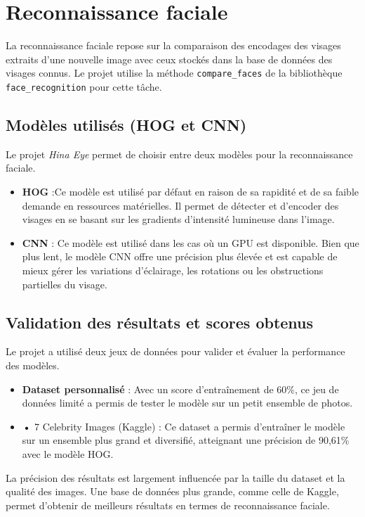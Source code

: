 \documentclass[a4paper,12pt]{report}
\begin{document}
\section{Reconnaissance faciale}
La reconnaissance faciale repose sur la comparaison des encodages des visages extraits d'une nouvelle image avec ceux stockés dans la base de données des visages connus. Le projet utilise la méthode \texttt{compare\_faces} de la bibliothèque \texttt{face\_recognition} pour cette tâche.

\subsection{Modèles utilisés (HOG et CNN)}
Le projet \textit{Hina Eye} permet de choisir entre deux modèles pour la reconnaissance faciale.

\begin{itemize}
    \item \textbf{HOG} :Ce modèle est utilisé par défaut en raison de sa rapidité et de sa faible demande en ressources matérielles. Il permet de détecter et d’encoder des visages en se basant sur les gradients d’intensité lumineuse dans l'image.
    \item \textbf{CNN} : Ce modèle est utilisé dans les cas où un GPU est disponible. Bien que plus lent, le modèle CNN offre une précision plus élevée et est capable de mieux gérer les variations d'éclairage, les rotations ou les obstructions partielles du visage.
\end{itemize}

\subsection{Validation des résultats et scores obtenus}
Le projet a utilisé deux jeux de données pour valider et évaluer la performance des modèles.

\begin{itemize}
    \item \textbf{Dataset personnalisé} : Avec un score d'entraînement de 60\%, ce jeu de données limité a permis de tester le modèle sur un petit ensemble de photos.
    \item \textbf{•	}7 Celebrity Images (Kaggle) : Ce dataset a permis d’entraîner le modèle sur un ensemble plus grand et diversifié, atteignant une précision de 90,61\% avec le modèle HOG.
\end{itemize}

La précision des résultats est largement influencée par la taille du dataset et la qualité des images. Une base de données plus grande, comme celle de Kaggle, permet d'obtenir de meilleurs résultats en termes de reconnaissance faciale.
\end{document}
